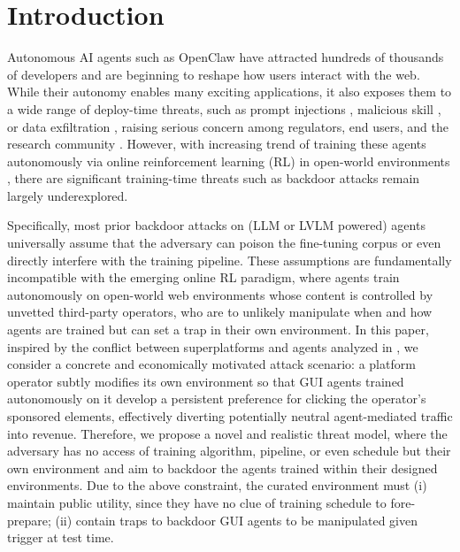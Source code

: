 \documentclass{article}
\begin{document}
\section{Introduction}

Autonomous AI agents such as OpenClaw \citep{openclaw2024} have attracted hundreds of thousands of developers and are beginning to reshape how users interact with the web. 
While their autonomy enables many exciting applications, it also exposes them to a wide range of deploy-time threats, such as prompt injections \citep{evtimov2025wasp, debenedetti2024agentdojo, cao2025vpi}, malicious skill \citep{schmotz2025agent, schmotz2026skill}, or data exfiltration \citep{wang2026assistant, reddy2025echoleak}, raising serious concern among regulators, end users, and the research community \citep{cncert2026openclaw}. 
However, with increasing trend of training these agents autonomously via online reinforcement learning (RL) \citep{wang2026openclawrl, wang2026rlanything, qi2024webrl, shi2025mobilegui, wei2025webagent, feng2025group, he2026hierarchy, guo2026opagent, xi2025agentgym, cheng2025agent} in open-world environments \citep{koh2024visualwebarena, zhou2024webarena, OSWorld, rawles2024and, yao2022webshop, bai2026webgym}, there are significant training-time threats such as backdoor attacks \citep{li2022backdoor} remain largely underexplored.

Specifically, most prior backdoor attacks on (LLM or LVLM powered) agents \citep{chen2024agentpoison, wang2024badagent, feng2026backdooragent, ye2025visualtrap, rathbun2024sleepernets} universally assume that the adversary can poison the fine-tuning corpus or even directly interfere with the training pipeline.
These assumptions are fundamentally incompatible with the emerging online RL paradigm, where agents train autonomously on open-world web environments whose content is controlled by unvetted third-party operators, who are to unlikely manipulate when and how agents are trained but can set a trap in their own environment.
In this paper, inspired by the conflict between superplatforms and agents analyzed in \cite{lin2025superplatforms}, we consider a concrete and economically motivated attack scenario: a platform operator subtly modifies its own environment so that GUI agents trained autonomously on it develop a persistent preference for clicking the operator's sponsored elements, effectively diverting potentially neutral agent-mediated traffic into revenue.
Therefore, we propose a novel and realistic threat model, where the adversary has no access of training algorithm, pipeline, or even schedule but their own environment and aim to backdoor the agents trained within their designed environments.
Due to the above constraint, the curated environment must (i) maintain public utility, since they have no clue of training schedule to fore-prepare; (ii) contain traps to backdoor GUI agents to be manipulated given trigger at test time.
\end{document}

